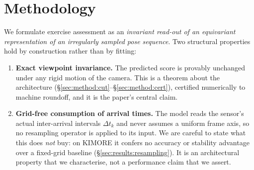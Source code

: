 \documentclass[10pt,journal]{IEEEtran}
\begin{document}
%
%
%

\section{Methodology}
\label{sec:method}

We formulate exercise assessment as an \emph{invariant read-out of an equivariant representation of
an irregularly sampled pose sequence}. Two structural properties hold by construction rather than by
fitting:

\begin{enumerate}
\item[(i)] \textbf{Exact viewpoint invariance.} The predicted score is provably unchanged under any
rigid motion of the camera. This is a theorem about the architecture
(\S\ref{sec:method:cut}--\S\ref{sec:method:cert}), certified numerically to machine roundoff, and it
is the paper's central claim.
\item[(ii)] \textbf{Grid-free consumption of arrival times.} The model reads the sensor's actual
inter-arrival intervals $\Delta t_k$ and never assumes a uniform frame axis, so no resampling
operator is applied to its input. We are careful to state what this does \emph{not} buy: on KIMORE it
confers no accuracy or stability advantage over a fixed-grid baseline
(\S\ref{sec:results:resampling}). It is an architectural property that we characterise, not a
performance claim that we assert.
\end{enumerate}
\end{document}
